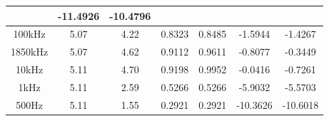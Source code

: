 \documentclass[12pt]{article}
\begin{document}
\begin{table}[H]
\begin{tabular}{|c|c|c|c|c|c|c|}
& -11.4926                                                                        & -10.4796                                                                                    \\ \hline
100kHz     & 5.07                                                                 & 4.22                                                                       & 0.8323                                                                  & 0.8485                                                                              & -1.5944                                                                        & -1.4267 \\ \hline
1850kHz     & 5.07                                                                 & 4.62                                                                        & 0.9112                                                                  & 0.9611                                                                              & -0.8077                                                                        & -0.3449                                                                                    \\ \hline
10kHz      & 5.11                                                                 & 4.70 & 0.9198                                                                  & 0.9952 & -0.0416 & -0.7261 \\ \hline
1kHz      & 5.11                                                                 & 2.59                                                                        & 0.5266                                                                  & 0.5266                                                                              & -5.9032                                                                         & -5.5703                                                                                     \\ \hline
500Hz     & 5.11                                                                 & 1.55 & 0.2921                                                                  & 0.2921                                                                              & -10.3626                                                                         & -10.6018 \\ \hline
\end{tabular}
\end{table}
\end{document}
